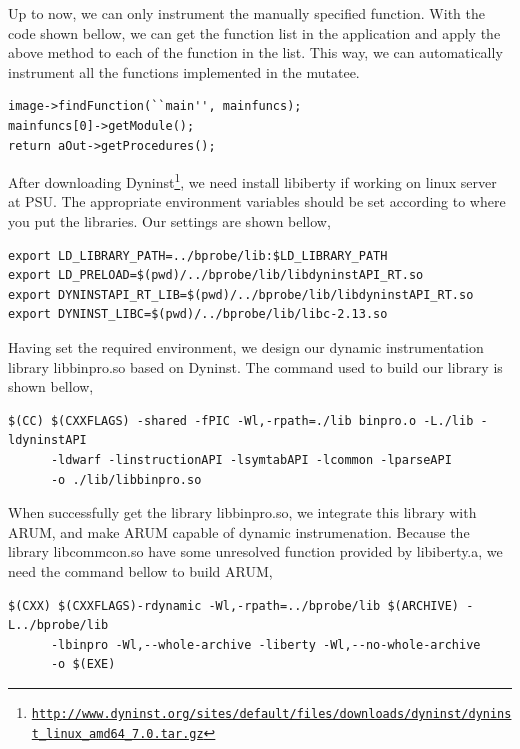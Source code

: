 \documentclass[11pt,letterpaper,oneside]{article}
\begin{document}
Up to now, we can only instrument the manually specified function. With the code shown bellow, we can get the function list in the application and apply the above method to each of the function in the list. This way, we can automatically instrument all the functions implemented in the mutatee.
\begin{Verbatim}[frame=single]
image->findFunction(``main'', mainfuncs);
mainfuncs[0]->getModule();
return aOut->getProcedures();
\end{Verbatim}

After downloading Dyninst\footnote{\texttt{\url{http://www.dyninst.org/sites/default/files/downloads/dyninst/dyninst_linux_amd64_7.0.tar.gz}}}, we need install libiberty if working on linux server at PSU. The appropriate environment variables should be set according to where you put the libraries. Our settings are shown bellow,

\begin{Verbatim}[frame=single]
export LD_LIBRARY_PATH=../bprobe/lib:$LD_LIBRARY_PATH
export LD_PRELOAD=$(pwd)/../bprobe/lib/libdyninstAPI_RT.so
export DYNINSTAPI_RT_LIB=$(pwd)/../bprobe/lib/libdyninstAPI_RT.so
export DYNINST_LIBC=$(pwd)/../bprobe/lib/libc-2.13.so
\end{Verbatim}

Having set the required environment, we design our dynamic instrumentation library libbinpro.so based on Dyninst. The command used to build our library is shown bellow,

\begin{Verbatim}[frame=single]
$(CC) $(CXXFLAGS) -shared -fPIC -Wl,-rpath=./lib binpro.o -L./lib -ldyninstAPI
      -ldwarf -linstructionAPI -lsymtabAPI -lcommon -lparseAPI
      -o ./lib/libbinpro.so
\end{Verbatim}

When successfully get the library libbinpro.so, we integrate this library with ARUM, and make ARUM capable of dynamic instrumenation. Because the library libcommcon.so have some unresolved function provided by libiberty.a, we need the command bellow to build ARUM,

\begin{Verbatim}[frame=single]
$(CXX) $(CXXFLAGS)-rdynamic -Wl,-rpath=../bprobe/lib $(ARCHIVE) -L../bprobe/lib
      -lbinpro -Wl,--whole-archive -liberty -Wl,--no-whole-archive
      -o $(EXE)
\end{Verbatim}
\end{document}
